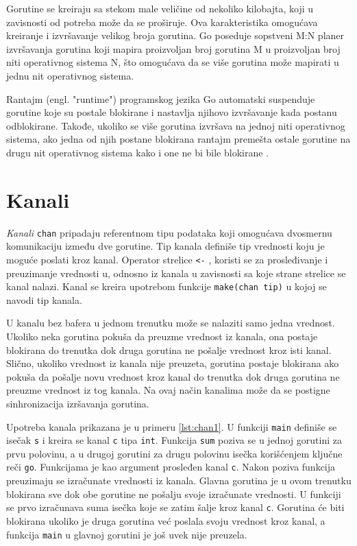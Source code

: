 \documentclass[12pt,oneside]{memoir}
\begin{document}
Gorutine se kreiraju sa stekom male veličine od nekoliko kilobajta, koji u zavisnosti od potreba može da se proširuje. Ova karakteristika omogućava kreiranje i izvršavanje velikog broja gorutina. Go poseduje sopstveni M:N planer izvršavanja gorutina koji mapira proizvoljan broj gorutina M u proizvoljan broj niti operativnog sistema N, što omogućava da se više gorutina može mapirati u jednu nit operativnog sistema. 

Rantajm (engl. "runtime") programskog jezika Go automatski suspenduje gorutine koje su postale blokirane i nastavlja njihovo izvršavanje kada postanu odblokirane. Takođe, ukoliko se više gorutina izvršava na jednoj niti operativnog sistema, ako jedna od njih postane blokirana rantajm premešta ostale gorutine na drugu nit operativnog sistema kako i one ne bi bile blokirane \cite{bookConc}. 

\section{Kanali} \label{chanel}

\textit{Kanali} \texttt{chan} pripadaju referentnom tipu podataka koji omogućava dvosmernu komunikaciju između dve gorutine. Tip kanala definiše tip vrednosti koju je moguće poslati kroz kanal. Operator strelice \texttt{<-} , koristi se za prosleđivanje i preuzimanje vrednosti u, odnosno iz kanala u zavisnosti sa koje strane strelice se kanal nalazi. Kanal se kreira upotrebom funkcije \texttt{make(chan tip)} u kojoj se navodi tip kanala.

U kanalu bez bafera u jednom trenutku može se nalaziti samo jedna vrednost. Ukoliko neka gorutina pokuša da preuzme vrednost iz kanala, ona postaje blokirana do trenutka dok druga gorutina ne pošalje vrednost kroz isti kanal. Slično, ukoliko vrednost iz kanala nije preuzeta, gorutina postaje blokirana ako pokuša da pošalje novu vrednost kroz kanal do trenutka dok druga gorutina ne preuzme vrednost iz tog kanala. Na ovaj način kanalima može da se postigne sinhronizacija izršavanja gorutina.

Upotreba kanala prikazana je u primeru \ref{lst:chan1}. U funkciji \texttt{main} definiše se isečak \texttt{s} i kreira se kanal \texttt{c} tipa \texttt{int}. Funkcija \texttt{sum}  poziva se u jednoj gorutini za prvu polovinu, a u drugoj gorutini za drugu polovinu isečka korišćenjem  ključne reči \texttt{go}. Funkcijama je kao argument prosleđen kanal \texttt{c}. Nakon poziva funkcija preuzimaju se izračunate vrednosti iz kanala. Glavna gorutina je u ovom trenutku blokirana sve dok obe gorutine ne pošalju svoje izračunate vrednosti. U funkciji se prvo izračunava suma isečka koje se zatim šalje kroz kanal \texttt{c}. Gorutina će biti blokirana ukoliko je druga gorutina već poslala svoju vrednost kroz kanal, a  funkcija \texttt{main} u glavnoj gorutini je još uvek nije preuzela. 
\end{document}
